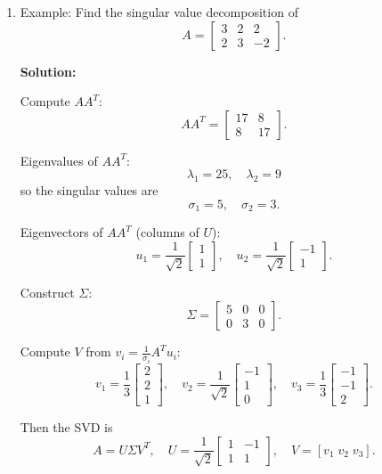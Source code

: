 \documentclass{article}
\begin{document}
\begin{enumerate}
\begin{enumerate}
\item Extremal property:
\[
\sigma_1 = \max_{\|x\|=1} \|Xx\|,
\]
i.e., $\sigma_1$ is the maximum stretching factor.
\item Image and discussion on Wikipedia.
\end{enumerate}

\item Example: Find the singular value decomposition of
\[
A =
\begin{bmatrix}
3 & 2 & 2 \\
2 & 3 & -2
\end{bmatrix}.
\]

\textbf{Solution:}

Compute $AA^T$:
\[
AA^T =
\begin{bmatrix}
17 & 8 \\
8 & 17
\end{bmatrix}.
\]

Eigenvalues of $AA^T$:
\[
\lambda_1 = 25, \quad \lambda_2 = 9
\]
so the singular values are
\[
\sigma_1 = 5, \quad \sigma_2 = 3.
\]

Eigenvectors of $AA^T$ (columns of $U$):
\[
u_1 = \frac{1}{\sqrt{2}}
\begin{bmatrix}1\\1\end{bmatrix}, \quad
u_2 = \frac{1}{\sqrt{2}}
\begin{bmatrix}-1\\1\end{bmatrix}.
\]

Construct $\Sigma$:
\[
\Sigma =
\begin{bmatrix}
5 & 0 & 0 \\
0 & 3 & 0
\end{bmatrix}.
\]

Compute $V$ from $v_i = \frac{1}{\sigma_i} A^T u_i$:
\[
v_1 =
\frac{1}{3}
\begin{bmatrix}2\\2\\1\end{bmatrix}, \quad
v_2 =
\frac{1}{\sqrt{2}}
\begin{bmatrix}-1\\1\\0\end{bmatrix}, \quad
v_3 =
\frac{1}{3}
\begin{bmatrix}-1\\-1\\2\end{bmatrix}.
\]

Then the SVD is
\[
A = U \Sigma V^T,
\quad
U = 
\frac{1}{\sqrt{2}}
\begin{bmatrix}1 & -1 \\ 1 & 1\end{bmatrix}, \quad
V = [v_1 \; v_2 \; v_3].
\]


\end{enumerate}
\end{document}
